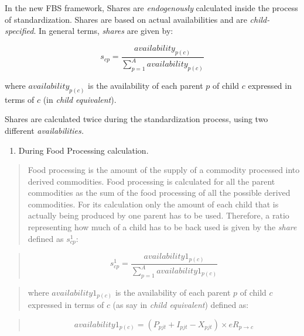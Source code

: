 \documentclass[]{article}
\providecommand{\tightlist}{%
  \setlength{\itemsep}{0pt}\setlength{\parskip}{0pt}}
\begin{document}
In the new FBS framework, Shares are \emph{endogenously} calculated
inside the process of standardization. Shares are based on actual
availabilities and are \emph{child-specified}. In general terms,
\emph{shares} are given by:

\begin{equation}
\label{eq:sharesGen}
s_{cp} = \frac{availability_{p(c)}}{\sum \limits_{p=1}^A{availability_{p(c)}}}
\end{equation}

where \(availability_{p(c)}\) is the availability of each parent \(p\)
of child \(c\) expressed in terms of \(c\) (in \emph{child equivalent}).

Shares are calculated twice during the standardization process, using
two different \emph{availabilities.}

\begin{enumerate}
\def\labelenumi{\arabic{enumi}.}
\tightlist
\item
  During Food Processing calculation.
\end{enumerate}

\begin{quote}
Food processing is the amount of the supply of a commodity processed
into derived commodities. Food processing is calculated for all the
parent commodities as the sum of the food processing of all the possible
derived commodities. For its calculation only the amount of each child
that is actually being produced by one parent has to be used. Therefore,
a ratio representing how much of a child has to be back used is given by
the \emph{share} defined as \(s^1_{cp}\):
\end{quote}

\begin{quote}
\begin{equation}
\label{eq:shares}
s^{1}_{cp} = \frac{availability1_{p(c)}}{\sum \limits_{p=1}^A{availability1_{p(c)}}}
\end{equation}
\end{quote}

\begin{quote}
where \(availability1_{p(c)}\) is the availability of each parent \(p\)
of child \(c\) expressed in terms of \(c\) (as say in \emph{child
equivalent}) defined as:
\end{quote}

\begin{quote}
\begin{equation}
\label{eq:availability 1}
availability1_{p(c)} = (P_{pjt} + I_{pjt} - X_{pjt})\times eR_{p\to c}
\end{equation}
\end{quote}
\end{document}
